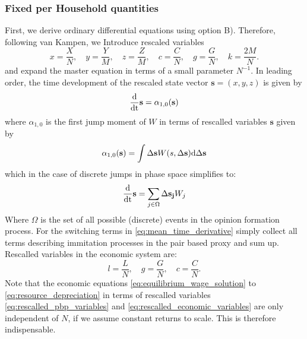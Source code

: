 \subsubsection*{Fixed per Household quantities}
First, we derive ordinary differential equations using option B). Therefore, following van Kampen, we Introduce rescaled variables
\begin{equation}
	x = \frac{X}{N}, \quad y = \frac{Y}{M}, \quad z = \frac{Z}{M}, \quad c = \frac{C}{N}, \quad g = \frac{G}{N}, \quad k = \frac{2M}{N}.
	\label{eq:rescalled_pbp_variables}
\end{equation}
and expand the master equation in terms of a small parameter $N^{-1}$. In leading order, the time development of the rescaled state vector $\mathbf{s} = (x, y, z)$ is given by 
\begin{equation}
	\frac{\rm{d}}{\rm{d}t}\mathbf{s} = \alpha_{1,0}(\mathbf{s})
	\label{macroscopic_equation}
\end{equation}
where $\alpha_{1,0}$ is the first jump moment of $W$ in terms of rescalled variables $\mathbf{s}$ given by
\begin{equation}
	\alpha_{1,0}(\mathbf{s}) = \int \Delta \mathbf{s} W(s, \Delta \mathbf{s}) {\rm d} \Delta \mathbf{s}
	\label{eq:jump_moment}
\end{equation}
which in the case of discrete jumps in phase space simplifies to:
\begin{equation}
	\frac{\rm{d}}{\rm{d}t}\mathbf{s} = \sum_{j \in \Omega}  \Delta \mathbf{s_j} W_j 
	\label{eq:transitions}
\end{equation}
Where $\Omega$ is the set of all possible (discrete) events in the opinion formation process.
For the switching terms in \eqref{eq:mean_time_derivative} simply collect all terms describing immitation processes in the pair based proxy and sum up.
Rescalled variables in the economic system are:
\begin{equation}
	l = \frac{L}{N}, \quad g = \frac{G}{N}, \quad c = \frac{C}{N}.
	\label{eq:rescalled_economic_variables}
\end{equation}
Note that the economic equations \eqref{eq:equilibrium_wage_solution} to \eqref{eq:resource_depreciation} in terms of rescalled variables \eqref{eq:rescalled_pbp_variables} and \eqref{eq:rescalled_economic_variables} are only independent of $N$, if we assume constant returns to scale. This is therefore indispensable.

